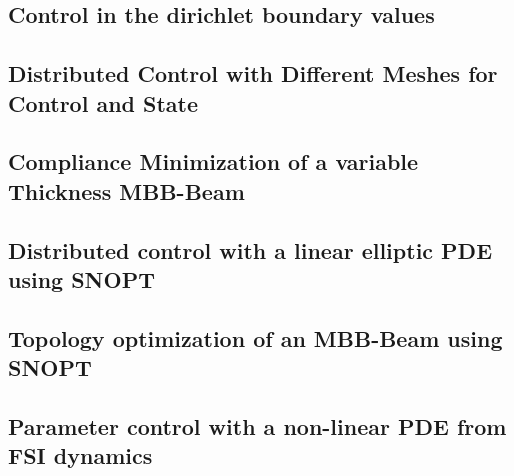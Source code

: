 \documentclass[a4paper,cleardoubleempty]{scrreprt}
\begin{document}
\subsection{Control in the dirichlet boundary values}
\label{OPT_Stat_Dirichlet_Boundary}

\clearpage
\subsection{Distributed Control with Different Meshes for Control and State}
\label{OPT_Stat_Distributed_MultiMesh}

\clearpage
\subsection{Compliance Minimization of a variable Thickness MBB-Beam}
\label{OPT_Stat_MBB-Beam}

\clearpage
\subsection{Distributed control with a linear elliptic PDE using SNOPT}
\label{OPT_Stat_Box_controlconstraints_SNOPT}

\clearpage
\subsection{Topology optimization of an MBB-Beam using SNOPT}
\label{OPT_Stat_TopOpt_MBB_SNOPT}

\clearpage
\subsection{Parameter control with a non-linear PDE from FSI dynamics}
\label{OPT_Stat_Param_Nonlin_FSI}
%
\clearpage










\printindex

\end{document}

